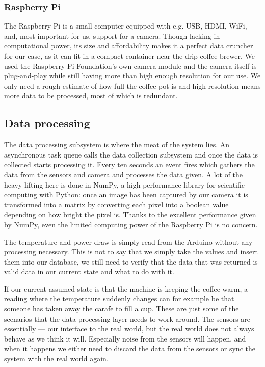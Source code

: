\documentclass[12pt,a4paper,oneside,article]{memoir}
\numberwithin{equation}{chapter}
\begin{document}
\subsubsection{Raspberry Pi}\label{sec:raspberry-pi}
The Raspberry Pi is a small computer equipped with e.g. USB, HDMI, WiFi, 
and, most important for us, support for a camera. Though lacking in 
computational power, its size and affordability makes it a perfect data 
cruncher for our case, as it can fit in a compact container near the drip 
coffee brewer. We used the Raspberry Pi Foundation's own camera module and the 
camera itself is plug-and-play while still having more than high enough 
resolution for our use. We only need a rough estimate of how full the coffee pot 
is and high resolution means more data to be processed, most of which is 
redundant.

\subsection{Data processing}\label{sec:data-processing}
The data processing subsystem is where the meat of the system lies. An 
asynchronous task queue calls the data collection subsystem and once the data is
collected starts processing it. Every ten seconds an event fires which gathers
the data from the sensors and camera and processes the data given. A lot of the
heavy lifting here is done in NumPy, a high-performance library for scientific
computing with Python: once an image has been captured by our camera it is
transformed into a matrix by converting each pixel into a boolean value
depending on how bright the pixel is. Thanks to the excellent performance given
by NumPy, even the limited computing power of the Raspberry Pi is no concern.

The temperature and power draw is simply read from the Arduino without any
processing necessary. This is not to say that we simply take the values and
insert them into our database, we still need to verify that the data that was
returned is valid data in our current state and what to do with it.

If our current assumed state is that the machine is keeping the coffee warm, a
reading where the temperature suddenly changes can for example be that someone
has taken away the carafe to fill a cup. These are just some of the scenarios
that the data processing layer needs to work around. The sensors are ---
essentially --- our interface to the real world, but the real world does not 
always behave as we think it will. Especially noise from the sensors will 
happen, and when it happens we either need to discard the data from the sensors 
or sync the system with the real world again. 
\end{document}
